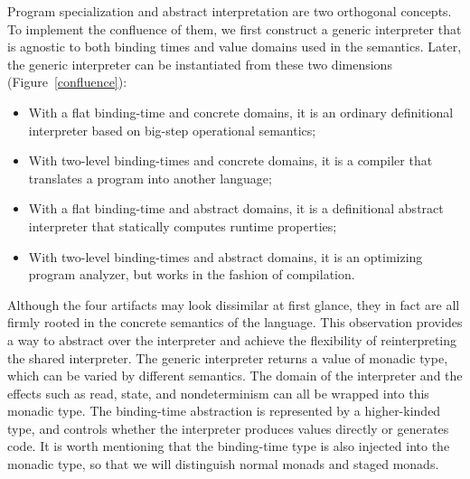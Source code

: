 Program specialization and abstract interpretation are two orthogonal
concepts.  To implement the confluence of them, we first construct a
generic interpreter that is agnostic to both binding times and value
domains used in the semantics.  Later, the generic interpreter can be
instantiated from these two dimensions (Figure~\ref{confluence}):
\begin{itemize}
\item With a flat binding-time and concrete domains, it is an ordinary
  definitional interpreter based on big-step operational semantics;
\item With two-level binding-times and concrete domains, it is a
  compiler that translates a program into another language;
\item With a flat binding-time and abstract domains, it is a
  definitional abstract interpreter \cite{DBLP:journals/pacmpl/DaraisLNH17}
  that statically computes runtime properties;
\item With two-level binding-times and abstract domains, it is an optimizing
  program analyzer, but works in the fashion of compilation.
\end{itemize}

Although the four artifacts may look dissimilar at first glance, they in
fact are all firmly rooted in the concrete semantics of the language.  This
observation provides a way to abstract over the interpreter and achieve the
flexibility of reinterpreting the shared interpreter.  The generic interpreter
returns a value of monadic type, which can be varied by different semantics.
The domain of the interpreter and the effects such as read, state, and
nondeterminism can all be wrapped into this monadic type.  The binding-time
abstraction is represented by a higher-kinded type, and controls whether the
interpreter produces values directly or generates code. It is worth mentioning
that the binding-time type is also injected into the monadic type, so that we
will distinguish normal monads and staged monads.

